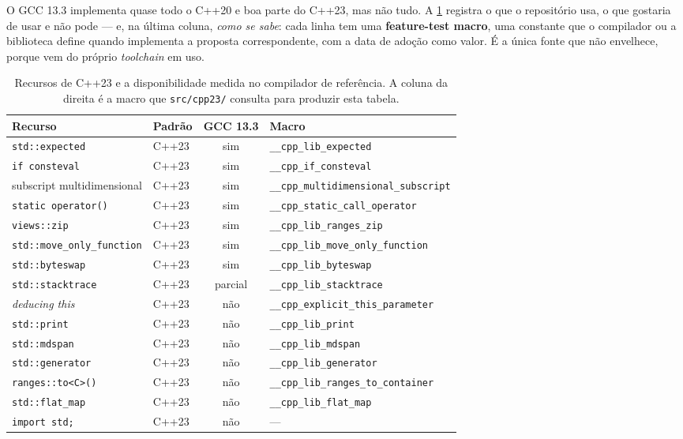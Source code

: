 O GCC 13.3 implementa quase todo o C++20 e boa parte do C++23, mas não tudo. A
\cref{tab:toolchain} registra o que o repositório usa, o que gostaria de usar e
não pode --- e, na última coluna, \emph{como se sabe}: cada linha tem uma
\textbf{feature-test macro}, uma constante que o compilador ou a biblioteca
define quando implementa a proposta correspondente, com a data de adoção como
valor. É a única fonte que não envelhece, porque vem do próprio
\emph{toolchain} em uso.

\begin{table}[htbp]
\centering
\caption{Recursos de C++23 e a disponibilidade medida no compilador de
         referência. A coluna da direita é a macro que \texttt{src/cpp23/}
         consulta para produzir esta tabela.}
\label{tab:toolchain}
\footnotesize
\begin{tabular}{@{}llcl@{}}
\toprule
\textbf{Recurso} & \textbf{Padrão} & \textbf{GCC 13.3} & \textbf{Macro} \\
\midrule
\texttt{std::expected}                 & C++23 & sim     & \texttt{\_\_cpp\_lib\_expected} \\
\texttt{if consteval}                  & C++23 & sim     & \texttt{\_\_cpp\_if\_consteval} \\
subscript multidimensional             & C++23 & sim     & \texttt{\_\_cpp\_multidimensional\_subscript} \\
\texttt{static operator()}             & C++23 & sim     & \texttt{\_\_cpp\_static\_call\_operator} \\
\texttt{views::zip}                    & C++23 & sim     & \texttt{\_\_cpp\_lib\_ranges\_zip} \\
\texttt{std::move\_only\_function}     & C++23 & sim     & \texttt{\_\_cpp\_lib\_move\_only\_function} \\
\texttt{std::byteswap}                 & C++23 & sim     & \texttt{\_\_cpp\_lib\_byteswap} \\
\texttt{std::stacktrace}               & C++23 & parcial & \texttt{\_\_cpp\_lib\_stacktrace} \\
\emph{deducing this}                   & C++23 & não     & \texttt{\_\_cpp\_explicit\_this\_parameter} \\
\texttt{std::print}                    & C++23 & não     & \texttt{\_\_cpp\_lib\_print} \\
\texttt{std::mdspan}                   & C++23 & não     & \texttt{\_\_cpp\_lib\_mdspan} \\
\texttt{std::generator}                & C++23 & não     & \texttt{\_\_cpp\_lib\_generator} \\
\texttt{ranges::to<C>()}               & C++23 & não     & \texttt{\_\_cpp\_lib\_ranges\_to\_container} \\
\texttt{std::flat\_map}                & C++23 & não     & \texttt{\_\_cpp\_lib\_flat\_map} \\
\texttt{import std;}                   & C++23 & não     & --- \\
\bottomrule
\end{tabular}
\end{table}

